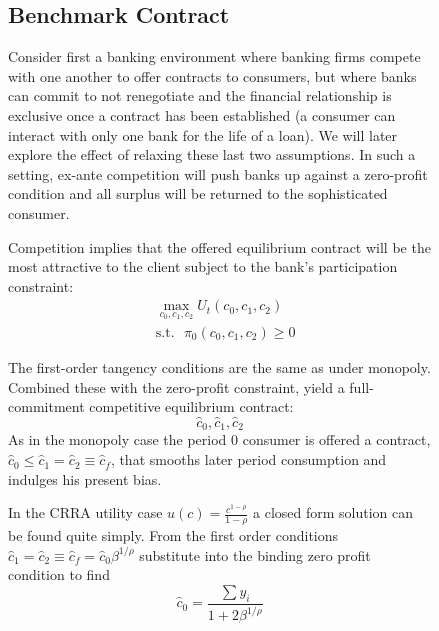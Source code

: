 \documentclass[11pt]{article}%
\begin{document}
\begin{figure}
{ 
 




\subsection{Benchmark Contract}

Consider first a banking environment where banking firms compete with one another to offer contracts to consumers, but where banks can commit to not renegotiate and the financial relationship is exclusive once a contract has been established (a consumer can interact with only one
bank for the life of a loan). We will later explore the effect of relaxing these last two assumptions. In such a  setting,   ex-ante competition will push banks up against a zero-profit condition
and all surplus will be returned to
the sophisticated consumer.

Competition implies that the  offered equilibrium contract will be the most attractive  to the client subject to the bank's participation constraint:%
\begin{align*}
&  \max_{c_{0},c_{1},c_{2}}U_{t}\left(  c_{0},c_{1},c_{2}\right) \\
&  \text{s}\text{.t}\text{.}\text{ }\pi_{0}\left(  c_{0},c_{1},c_{2}\right)
\geq0
\end{align*}


The first-order tangency conditions are the same as under monopoly. Combined these with the
zero-profit constraint, yield a full-commitment competitive equilibrium contract:%
\[
\hat{c}_{0},\hat{c}_{1},\hat{c}_{2}%
\]
As in the monopoly case the period 0 consumer is offered a contract, 
\(\hat{c}_{0}\leq\hat{c}_{1}=\hat{c}_{2}\equiv\hat{c}_{f}\), that smooths later period consumption and indulges his present bias. 

In the CRRA utility case $u(c)=\frac{c^{1-\rho }}{1-\rho }$ a closed form solution can be found quite simply.  From the first order conditions  \(\hat{c}_{1}=\hat{c}_{2}\equiv\hat{c}_{f}= \hat{c}_{0}\beta^{1/\rho}\)    substitute into the binding zero profit condition to find
 \begin{displaymath}
\hat{c}_{0} =\frac{\sum y_{i}}{1+2\beta^{1/\rho}}
\end{displaymath}
 

}
\end{figure}
\end{document}
